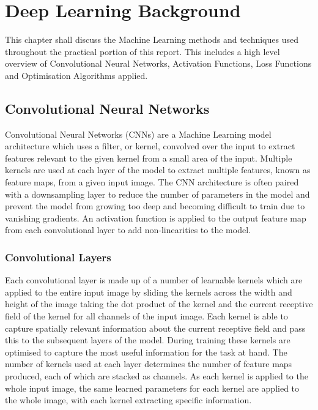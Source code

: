 


\chapter{Deep Learning Background}

This chapter shall discuss the Machine Learning methods and techniques used throughout the practical portion of this report.
This includes a high level overview of Convolutional Neural Networks, Activation Functions, Loss Functions and Optimisation Algorithms applied.

\section{Convolutional Neural Networks}
Convolutional Neural Networks (CNNs) are a Machine Learning model architecture which uses a filter, or kernel, convolved over the input to extract features relevant to the given kernel from a small area of the input.
Multiple kernels are used at each layer of the model to extract multiple features, known as feature maps, from a given input image.
The CNN architecture is often paired with a downsampling layer to reduce the number of parameters in the model and prevent the model from growing too deep and becoming difficult to train due to vanishing gradients.
An activation function is applied to the output feature map from each convolutional layer to add non-linearities to the model. 

\subsection{Convolutional Layers}
Each convolutional layer is made up of a number of learnable kernels which are applied to the entire input image by sliding the kernels across the width and height of the image taking the dot product of the kernel and the current receptive field of the kernel for all channels of the input image.
Each kernel is able to capture spatially relevant information about the current receptive field and pass this to the subsequent layers of the model.
During training these kernels are optimised to capture the most useful information for the task at hand.
The number of kernels used at each layer determines the number of feature maps produced, each of which are stacked as channels.
As each kernel is applied to the whole input image, the same learned parameters for each kernel are applied to the whole image, with each kernel extracting specific information.

